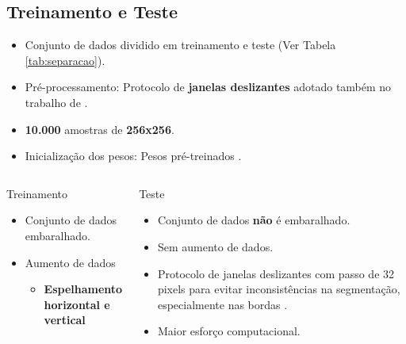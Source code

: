 \documentclass[%
  10pt,%
  aspectratio = 169,%
  compress,%
  t,%
  english,%
  brazilian,%
  tikz,
]{beamer}
\begin{document}
\subsection{Treinamento e Teste}\label{ssec:matmet7}

\begin{frame}
\begin{itemize}
    \item Conjunto de dados dividido em treinamento e teste (Ver Tabela \ref{tab:separacao}).
    \item Pré-processamento: Protocolo de \textbf{janelas deslizantes} adotado também no trabalho de \cite{Andre2021}.
    \item \textbf{10.000} amostras de \textbf{256x256}.
    \item Inicialização dos pesos: Pesos pré-treinados \cite{Imagenet2009}.
\end{itemize}

\begin{columns}[T]

\begin{block}{Treinamento}
    \begin{itemize}
        \item Conjunto de dados embaralhado.
        \item Aumento de dados
        \begin{itemize}
            \item \textbf{Espelhamento horizontal e vertical}
        \end{itemize}
    \end{itemize}
\end{block}

\begin{block}{Teste}
    \begin{itemize}
        \item Conjunto de dados \textbf{não} é embaralhado.
        \item Sem aumento de dados.
        \item Protocolo de janelas deslizantes com passo de 32 pixels para evitar inconsistências na segmentação, especialmente nas bordas \cite{Farhangfar2019}.
        \item Maior esforço computacional.
    \end{itemize}
\end{block}

\end{columns}
\end{frame}
\end{document}
